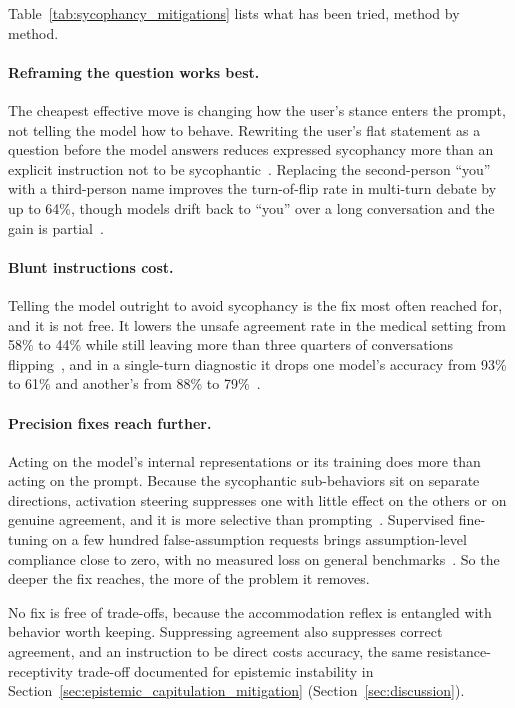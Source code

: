 Table~\ref{tab:sycophancy_mitigations} lists what has been tried, method by method.

\paragraph{Reframing the question works best.} The cheapest effective move is changing how the user's stance enters the prompt, not telling the model how to behave. Rewriting the user's flat statement as a question before the model answers reduces expressed sycophancy more than an explicit instruction not to be sycophantic~\citep{AskDontTellReducing_Dubois}. Replacing the second-person ``you'' with a third-person name improves the turn-of-flip rate in multi-turn debate by up to 64\%, though models drift back to ``you'' over a long conversation and the gain is partial~\citep{MeasuringSycophancyMultiturn_Hong, ElephantMeasuringSocial_Cheng}.

\paragraph{Blunt instructions cost.} Telling the model outright to avoid sycophancy is the fix most often reached for, and it is not free. It lowers the unsafe agreement rate in the medical setting from 58\% to 44\% while still leaving more than three quarters of conversations flipping~\citep{MedPRESSPatientPressureInduced_Joy}, and in a single-turn diagnostic it drops one model's accuracy from 93\% to 61\% and another's from 88\% to 79\%~\citep{BeaconSingleTurnDiagnosis_Pandey}.

\paragraph{Precision fixes reach further.} Acting on the model's internal representations or its training does more than acting on the prompt. Because the sycophantic sub-behaviors sit on separate directions, activation steering suppresses one with little effect on the others or on genuine agreement, and it is more selective than prompting~\citep{SycophancyIsNotOne_Vennemeyer,BeaconSingleTurnDiagnosis_Pandey}. Supervised fine-tuning on a few hundred false-assumption requests brings assumption-level compliance close to zero, with no measured loss on general benchmarks~\citep{WhenHelpfulnessBackfiresLLMs_Chen}. So the deeper the fix reaches, the more of the problem it removes.

No fix is free of trade-offs, because the accommodation reflex is entangled with behavior worth keeping. Suppressing agreement also suppresses correct agreement, and an instruction to be direct costs accuracy, the same resistance-receptivity trade-off documented for epistemic instability in Section~\ref{sec:epistemic_capitulation_mitigation} (Section~\ref{sec:discussion}).

